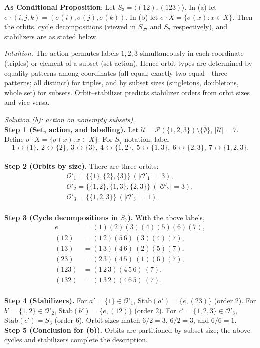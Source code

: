 \documentclass[11pt]{article}
\theoremstyle{definition}
\begin{document}
\noindent\textbf{As Conditional Proposition}: Let $S_3=\langle (12),(123)\rangle$. In (a) let $\sigma\cdot(i,j,k)=(\sigma(i),\sigma(j),\sigma(k))$. In (b) let $\sigma\cdot X=\{\sigma(x):x\in X\}$. Then the orbits, cycle decompositions (viewed in $S_{27}$ and $S_7$ respectively), and stabilizers are as stated below.

\newpage

\dotfill

\emph{Intuition.} The action permutes labels $1,2,3$ simultaneously in each coordinate (triples) or element of a subset (set action). Hence orbit types are determined by equality patterns among coordinates (all equal; exactly two equal—three patterns; all distinct) for triples, and by subset sizes (singletons, doubletons, whole set) for subsets. Orbit–stabilizer predicts stabilizer orders from orbit sizes and vice versa.\\

\dotfill

\emph{Solution (b): action on nonempty subsets).}\\
\textbf{Step 1 (Set, action, and labelling).} Let $\mathcal U=\mathcal P(\{1,2,3\})\setminus\{\emptyset\}$, $|\mathcal U|=7$. Define $\sigma\cdot X=\{\sigma(x):x\in X\}$. For $S_7$-notation, label
\[
1\!\leftrightarrow\!\{1\},\ 2\!\leftrightarrow\!\{2\},\ 3\!\leftrightarrow\!\{3\},\ 
4\!\leftrightarrow\!\{1,2\},\ 5\!\leftrightarrow\!\{1,3\},\ 6\!\leftrightarrow\!\{2,3\},\ 
7\!\leftrightarrow\!\{1,2,3\}.
\] \\
\textbf{Step 2 (Orbits by size).} There are three orbits:
\begin{align*}
\mathcal O'_1=\big\{\{1\},\{2\},\{3\}\big\}\ (|\mathcal O'_1|=3),\\
\mathcal O'_2=\big\{\{1,2\},\{1,3\},\{2,3\}\big\}\ (|\mathcal O'_2|=3),\\
\mathcal O'_3=\big\{\{1,2,3\}\big\}\ (|\mathcal O'_3|=1).
\end{align*} \\
\textbf{Step 3 (Cycle decompositions in $S_7$).} With the above labels,
\[
\begin{aligned}
e&=(1)(2)(3)(4)(5)(6)(7),\\
(12)&=(1\,2)(5\,6)\ (3)(4)(7),\\
(13)&=(1\,3)(4\,6)\ (2)(5)(7),\\
(23)&=(2\,3)(4\,5)\ (1)(6)(7),\\
(123)&=(1\,2\,3)(4\,5\,6)\ (7),\\
(132)&=(1\,3\,2)(4\,6\,5)\ (7).
\end{aligned}
\] \\
\textbf{Step 4 (Stabilizers).} For $a'=\{1\}\in\mathcal O'_1$, $\mathrm{Stab}(a')=\{e,(23)\}$ (order $2$). For $b'=\{1,2\}\in\mathcal O'_2$, $\mathrm{Stab}(b')=\{e,(12)\}$ (order $2$). For $c'=\{1,2,3\}\in\mathcal O'_3$, $\mathrm{Stab}(c')=S_3$ (order $6$). Orbit sizes match $6/2=3$, $6/2=3$, and $6/6=1$.\\
\textbf{Step 5 (Conclusion for (b)).} Orbits are partitioned by subset size; the above cycles and stabilizers complete the description.\\
\end{document}
